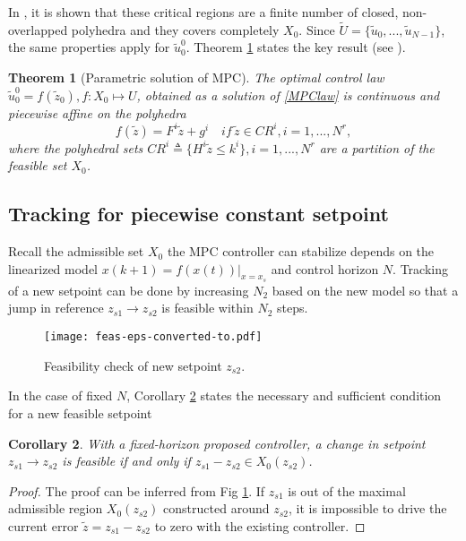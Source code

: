 \documentclass[5p,authoryear,times]{elsarticle}
\newtheorem{thm}{Theorem}
\newtheorem{corollary}[thm]{Corollary}
\begin{document}
In \citet{Bao02,Ton03algorithm}, it is shown that these critical regions are a finite number of closed, non-overlapped polyhedra and they covers completely $X_0$. Since $\tilde{U}=\{\tilde{u}_0,...,\tilde{u}_{N-1}\}$, the same properties apply for $\tilde{u}^0_0$. Theorem \ref{theo2} states the key result (see \citet{Bem02explicit}).

\begin{thm}[Parametric solution of MPC]
\label{theo2}
The optimal control law $\tilde{u}^0_0=f(\tilde{z}_0),f:X_0\mapsto U$, obtained as a solution of \eqref{MPClaw} is continuous and piecewise affine on the polyhedra
\begin{equation}
f(\tilde{z})=F^i\tilde{z}+g^i\quad if\, \tilde{z}\in CR^i, i=1,...,N^r,
\label{mulctrl}
\end{equation}
where the polyhedral sets $CR^i\triangleq \{H^i\tilde{z}\leq k^i\}, i=1,...,N^r$ are a partition of the feasible set $X_0$.
\end{thm}

\subsection*{Tracking for piecewise constant setpoint}
Recall the admissible set $X_0$ the MPC controller can stabilize depends on the linearized model $x(k+1)=f(x(t))|_{x=x_s}$ and control horizon $N$. Tracking of a new setpoint can be done by increasing $N_2$ based on the new model so that a jump in reference $z_{s1}\rightarrow z_{s2}$ is feasible within $N_2$ steps. 

\begin{figure}[!t]
\centering
\texttt{[image: feas-eps-converted-to.pdf]}
\caption{Feasibility check of new setpoint $z_{s2}$.}
\label{feas}
\end{figure}

In the case of fixed $N$, Corollary \ref{reffsb} states the necessary and sufficient condition for a new feasible setpoint

\begin{corollary}\label{reffsb}
With a fixed-horizon proposed controller, a change in setpoint $z_{s1}\rightarrow z_{s2}$ is feasible if and only if $z_{s1}-z_{s2}\in X_0(z_{s2})$.
\end{corollary}
\begin{proof}
The proof can be inferred from Fig \ref{feas}. If $z_{s1}$ is out of the maximal admissible region $X_0(z_{s2})$ constructed around $z_{s2}$, it is impossible to drive the current error $\tilde{z}=z_{s1}-z_{s2}$ to zero with the existing controller.
\end{proof}
\end{document}
